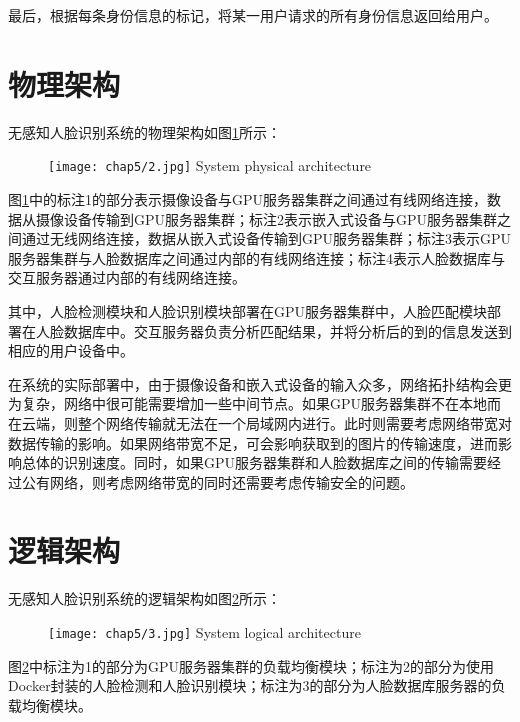 最后，根据每条身份信息的标记，将某一用户请求的所有身份信息返回给用户。

\section{物理架构}

无感知人脸识别系统的物理架构如图\ref{fig:chap5:phy}所示：

\begin{figure}[!htp]
	\centering
	\texttt{[image: chap5/2.jpg]}
	{System physical architecture}
	\label{fig:chap5:phy}
\end{figure}

图\ref{fig:chap5:phy}中的标注1的部分表示摄像设备与GPU服务器集群之间通过有线网络连接，数据从摄像设备传输到GPU服务器集群；标注2表示嵌入式设备与GPU服务器集群之间通过无线网络连接，数据从嵌入式设备传输到GPU服务器集群；标注3表示GPU服务器集群与人脸数据库之间通过内部的有线网络连接；标注4表示人脸数据库与交互服务器通过内部的有线网络连接。

其中，人脸检测模块和人脸识别模块部署在GPU服务器集群中，人脸匹配模块部署在人脸数据库中。交互服务器负责分析匹配结果，并将分析后的到的信息发送到相应的用户设备中。

在系统的实际部署中，由于摄像设备和嵌入式设备的输入众多，网络拓扑结构会更为复杂，网络中很可能需要增加一些中间节点。如果GPU服务器集群不在本地而在云端，则整个网络传输就无法在一个局域网内进行。此时则需要考虑网络带宽对数据传输的影响。如果网络带宽不足，可会影响获取到的图片的传输速度，进而影响总体的识别速度。同时，如果GPU服务器集群和人脸数据库之间的传输需要经过公有网络，则考虑网络带宽的同时还需要考虑传输安全的问题。


\section{逻辑架构}

无感知人脸识别系统的逻辑架构如图\ref{fig:chap5:logic}所示：

\begin{figure}[!htp]
	\centering
	\texttt{[image: chap5/3.jpg]}
	{System logical architecture}
	\label{fig:chap5:logic}
\end{figure}

图\ref{fig:chap5:logic}中标注为1的部分为GPU服务器集群的负载均衡模块；标注为2的部分为使用Docker封装的人脸检测和人脸识别模块；标注为3的部分为人脸数据库服务器的负载均衡模块。

